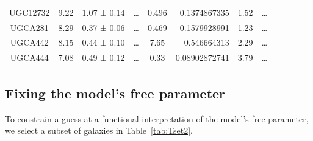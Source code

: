 \documentclass[reprint,%
 amsmath,amssymb,
 aps,
]{revtex4-1}
\begin{document}
\begin{table}[]
\begin{tabular}{cccccrrc}
\rowcolor[HTML]{F3F3F3} 
UGC12732             & 9.22                      & 1.07 ± 0.14           & …                      & 0.496                                                        & 0.1374867335                                                          & 1.52                                                          & …                                                             \\
\rowcolor[HTML]{F3F3F3} 
UGCA281              & 8.29                      & 0.37 ± 0.06           & …                      & 0.469                                                        & 0.1579928991                                                          & 1.23                                                            & …                                                             \\
\rowcolor[HTML]{F3F3F3} 
UGCA442              & 8.15                      & 0.44 ± 0.10           & …                      & 7.65                                                         & 0.546664313                                                           & 2.29                                                           & …                                                             \\
\rowcolor[HTML]{F3F3F3} 
UGCA444              & 7.08                      & 0.49 ± 0.12           & …                      & 0.33                                                         & 0.08902872741                                                         & 3.79                                                           & …                                                            
\end{tabular}
\end{table}
\subsection{Fixing   the model's free parameter }

To constrain a guess at a functional interpretation of the model's free-parameter, we select a
  subset of galaxies in Table~\ref{tab:Tset2}.
  
\end{document}
